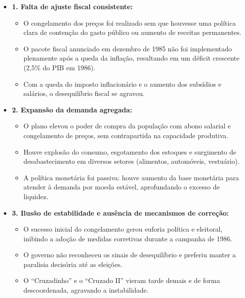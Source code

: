 \documentclass[a4paper,12pt]{article}[abntex2]
\begin{document}
\begin{itemize}
    \item \textbf{1. Falta de ajuste fiscal consistente:}
    \begin{itemize}
        \item O congelamento dos preços foi realizado sem que houvesse uma política clara de contenção do gasto público ou aumento de receitas permanentes.
        \item O pacote fiscal anunciado em dezembro de 1985 não foi implementado plenamente após a queda da inflação, resultando em um déficit crescente (2,5\% do PIB em 1986).
        \item Com a queda do imposto inflacionário e o aumento dos subsídios e salários, o desequilíbrio fiscal se agravou.
    \end{itemize}

    \item \textbf{2. Expansão da demanda agregada:}
    \begin{itemize}
        \item O plano elevou o poder de compra da população com abono salarial e congelamento de preços, sem contrapartida na capacidade produtiva.
        \item Houve explosão do consumo, esgotamento dos estoques e surgimento de desabastecimento em diversos setores (alimentos, automóveis, vestuário).
        \item A política monetária foi passiva: houve aumento da base monetária para atender à demanda por moeda estável, aprofundando o excesso de liquidez.
    \end{itemize}

    \item \textbf{3. Ilusão de estabilidade e ausência de mecanismos de correção:}
    \begin{itemize}
        \item O sucesso inicial do congelamento gerou euforia política e eleitoral, inibindo a adoção de medidas corretivas durante a campanha de 1986.
        \item O governo não reconheceu os sinais de desequilíbrio e preferiu manter a paralisia decisória até as eleições.
        \item O “Cruzadinho” e o “Cruzado II” vieram tarde demais e de forma descoordenada, agravando a instabilidade.
    \end{itemize}


\end{itemize}
\end{document}
